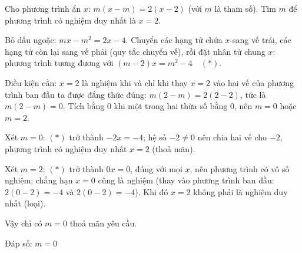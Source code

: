 \begin{problem}[8DS-PT1-030]
Cho phương trình ẩn $x$: $m(x - m) = 2(x - 2)$ (với $m$ là tham số). Tìm $m$ để phương trình có nghiệm duy nhất là $x = 2$.

\begin{solution}
Bỏ dấu ngoặc: $mx - m^2 = 2x - 4$. Chuyển các hạng tử chứa $x$ sang vế trái, các hạng tử còn lại sang vế phải (quy tắc chuyển vế), rồi đặt nhân tử chung $x$: phương trình tương đương với $(m - 2)x = m^2 - 4 \quad (*)$.

Điều kiện cần: $x = 2$ là nghiệm khi và chỉ khi thay $x = 2$ vào hai vế của phương trình ban đầu ta được đẳng thức đúng: $m(2 - m) = 2(2 - 2)$, tức là $m(2 - m) = 0$. Tích bằng $0$ khi một trong hai thừa số bằng $0$, nên $m = 0$ hoặc $m = 2$.

Xét $m = 0$: $(*)$ trở thành $-2x = -4$; hệ số $-2 \neq 0$ nên chia hai vế cho $-2$, phương trình có nghiệm duy nhất $x = 2$ (thoả mãn).

Xét $m = 2$: $(*)$ trở thành $0x = 0$, đúng với mọi $x$, nên phương trình có vô số nghiệm; chẳng hạn $x = 0$ cũng là nghiệm (thay vào phương trình ban đầu: $2(0 - 2) = -4$ và $2(0 - 2) = -4$). Khi đó $x = 2$ không phải là nghiệm duy nhất (loại).

Vậy chỉ có $m = 0$ thoả mãn yêu cầu.

Đáp số: $\boxed{m = 0}$
\end{solution}
\end{problem}


